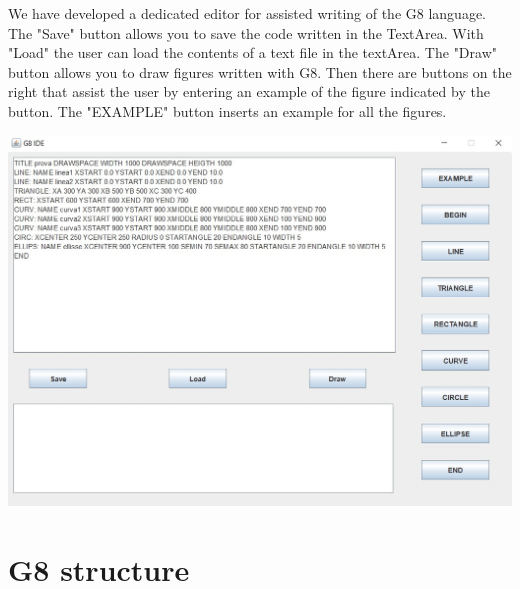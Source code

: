 \documentclass[a4paper]{article}
\begin{document}
We have developed a dedicated editor for assisted writing of the G8 language.
The "Save" button allows you to save the code written in the TextArea.
With "Load" the user can load the contents of a text file in the textArea.
The "Draw" button allows you to draw figures written with G8.
Then there are buttons on the right that assist the user by entering an example of the figure indicated by the button.
The "EXAMPLE" button inserts an example for all the figures.\\
\begin{center}
\includegraphics[scale=2.5]{editor.jpg} 
\end{center}

\newpage

\section{G8 structure}
\end{document}
